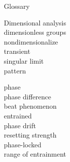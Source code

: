 \documentclass[9pt,aspectratio=43,mathserif,table]{beamer}
\begin{document}
\begin{frame}{Glossary}

  \begin{multicols}{2}
    Dimensional analysis
    \\ dimensionless groups
    \\ nondimensionalize
    \\ transient
    \\ singular limit
    \\ pattern

    \medskip
   
    phase
    \\ phase difference
    \\ beat phenomenon
    \\ entrained
    \\ phase drift
    \\ resetting strength
    \\ phase-locked
    \\ range of entrainment
  \end{multicols}

\end{frame}
\end{document}
